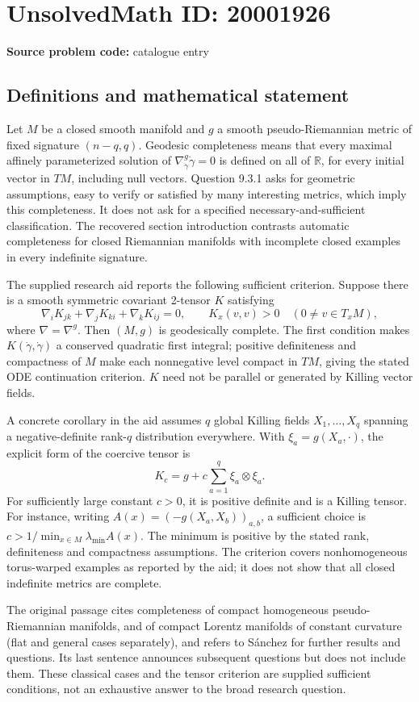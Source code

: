 \documentclass[11pt]{article}
\newcommand{\R}{\mathbb{R}}
\begin{document}
\section*{UnsolvedMath ID: 20001926}
\textbf{Source problem code:} catalogue entry
\subsection{Definitions and mathematical statement}
Let \(M\) be a closed smooth manifold and \(g\) a smooth pseudo-Riemannian metric of fixed signature \((n-q,q)\). Geodesic completeness means that every maximal affinely parameterized solution of \(\nabla^g_{\dot\gamma}\dot\gamma=0\) is defined on all of \(\R\), for every initial vector in \(TM\), including null vectors. Question 9.3.1 asks for geometric assumptions, easy to verify or satisfied by many interesting metrics, which imply this completeness. It does not ask for a specified necessary-and-sufficient classification. The recovered section introduction contrasts automatic completeness for closed Riemannian manifolds with incomplete closed examples in every indefinite signature.

The supplied research aid reports the following sufficient criterion. Suppose there is a smooth symmetric covariant 2-tensor \(K\) satisfying
\[
\nabla_iK_{jk}+\nabla_jK_{ki}+\nabla_kK_{ij}=0,
\qquad K_x(v,v)>0\quad(0\ne v\in T_xM),
\]
where \(\nabla=\nabla^g\). Then \((M,g)\) is geodesically complete. The first condition makes \(K(\dot\gamma,\dot\gamma)\) a conserved quadratic first integral; positive definiteness and compactness of \(M\) make each nonnegative level compact in \(TM\), giving the stated ODE continuation criterion. \(K\) need not be parallel or generated by Killing vector fields.

A concrete corollary in the aid assumes \(q\) global Killing fields \(X_1,\ldots,X_q\) spanning a negative-definite rank-\(q\) distribution everywhere. With \(\xi_a=g(X_a,\cdot)\), the explicit form of the coercive tensor is
\[
K_c=g+c\sum_{a=1}^q\xi_a\otimes\xi_a.
\]
For sufficiently large constant \(c>0\), it is positive definite and is a Killing tensor. For instance, writing \(A(x)=(-g(X_a,X_b))_{a,b}\), a sufficient choice is \(c>1/\min_{x\in M}\lambda_{\min}A(x)\). The minimum is positive by the stated rank, definiteness and compactness assumptions. The criterion covers nonhomogeneous torus-warped examples as reported by the aid; it does not show that all closed indefinite metrics are complete.

The original passage cites completeness of compact homogeneous pseudo-Riemannian manifolds, and of compact Lorentz manifolds of constant curvature (flat and general cases separately), and refers to S\'anchez for further results and questions. Its last sentence announces subsequent questions but does not include them. These classical cases and the tensor criterion are supplied sufficient conditions, not an exhaustive answer to the broad research question.
\end{document}
